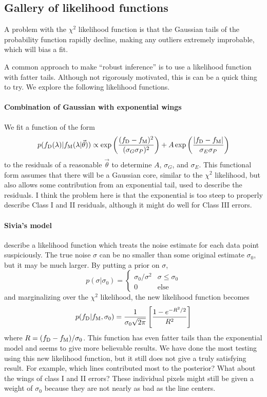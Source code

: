 \documentclass[preprint]{aastex} %
\newcommand{\vt}{\vec{\theta}}
\newcommand{\fM}{f_{\rm M}}
\newcommand{\fD}{f_{\rm D}}
\begin{document}
\subsection{Gallery of likelihood functions}
A problem with the $\chi^2$ likelihood function is that the Gaussian tails of the probability function rapidly decline, making any outliers extremely improbable, which will bias a fit. 

A common approach to make ``robust inference'' is to use a likelihood function with fatter tails. Although not rigorously motivated, this is can be a quick thing to try. We explore the following likelihood functions.

\paragraph{Combination of Gaussian with exponential wings}
We fit a function of the form
\begin{equation}
  p(\fD(\lambda) | \fM(\lambda | \vt)) \propto \exp \left (\frac{(\fD - \fM)^2}{(\sigma_G \sigma_P)^2} \right ) + A \exp \left (\frac{|\fD - \fM|}{\sigma_E \sigma_P}  \right )
\end{equation}
to the residuals of a reasonable $\vt$ to determine $A$, $\sigma_G$, and $\sigma_E$. This functional form assumes that there will be a Gaussian core, similar to the $\chi^2$ likelihood, but also allows some contribution from an exponential tail, used to describe the residuals. I think the problem here is that the exponential is too steep to properly describe Class I and II residuals, although it might do well for Class III errors.

\paragraph{Sivia's model}
\citet{ss06} describe a likelihood function which treats the noise estimate for each data point suspiciously. The true noise $\sigma$ can be no smaller than some original estimate $\sigma_0$, but it may be much larger. By putting a prior on $\sigma$, 
\begin{equation}
  p(\sigma | \sigma_0) = \left \{ \begin{array}{cc}
    \sigma_0/\sigma^2 & \sigma  \leq \sigma_0\\
    0                 & \textrm{else}
  \end{array}
    \right.
\end{equation}
and marginalizing over the $\chi^2$ likelihood, the new likelihood function becomes
\begin{equation}
  p(\fD | \fM, \sigma_0) = \frac{1}{\sigma_0 \sqrt{2 \pi}} \left [ \frac{1 - e^{-R^2/2}}{R^2} \right ] 
\end{equation}
where $R = (\fD - \fM)/\sigma_0$. This function has even fatter tails than the exponential model and seems to give more believable results. We have done the most testing using this new likelihood function, but it still does not give a truly satisfying result. For example, which lines contributed most to the posterior? What about the wings of class I and II errors? These individual pixels might still be given a weight of $\sigma_0$ because they are not nearly as bad as the line centers.
\end{document}

